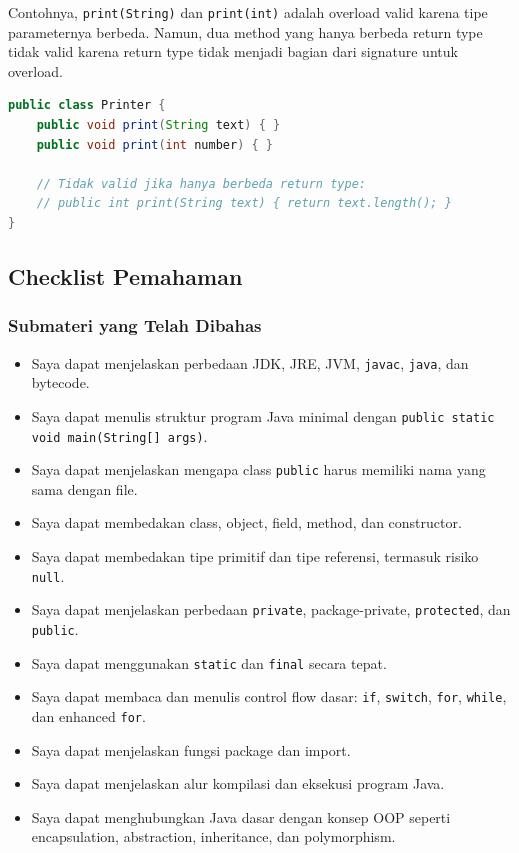 Contohnya, \texttt{print(String)} dan \texttt{print(int)} adalah overload valid karena tipe parameternya berbeda. Namun, dua method yang hanya berbeda return type tidak valid karena return type tidak menjadi bagian dari signature untuk overload.

\begin{lstlisting}[language=Java, caption={Overload valid dan tidak valid}, label={lst:method-signature}]
public class Printer {
    public void print(String text) { }
    public void print(int number) { }

    // Tidak valid jika hanya berbeda return type:
    // public int print(String text) { return text.length(); }
}
\end{lstlisting}

\subsection{Checklist Pemahaman}

\subsubsection{Submateri yang Telah Dibahas}

\begin{itemize}
    \item[$\square$] Saya dapat menjelaskan perbedaan JDK, JRE, JVM, \texttt{javac}, \texttt{java}, dan bytecode.
    \item[$\square$] Saya dapat menulis struktur program Java minimal dengan \texttt{public static void main(String[] args)}.
    \item[$\square$] Saya dapat menjelaskan mengapa class \texttt{public} harus memiliki nama yang sama dengan file.
    \item[$\square$] Saya dapat membedakan class, object, field, method, dan constructor.
    \item[$\square$] Saya dapat membedakan tipe primitif dan tipe referensi, termasuk risiko \texttt{null}.
    \item[$\square$] Saya dapat menjelaskan perbedaan \texttt{private}, package-private, \texttt{protected}, dan \texttt{public}.
    \item[$\square$] Saya dapat menggunakan \texttt{static} dan \texttt{final} secara tepat.
    \item[$\square$] Saya dapat membaca dan menulis control flow dasar: \texttt{if}, \texttt{switch}, \texttt{for}, \texttt{while}, dan enhanced \texttt{for}.
    \item[$\square$] Saya dapat menjelaskan fungsi package dan import.
    \item[$\square$] Saya dapat menjelaskan alur kompilasi dan eksekusi program Java.
    \item[$\square$] Saya dapat menghubungkan Java dasar dengan konsep OOP seperti encapsulation, abstraction, inheritance, dan polymorphism.
\end{itemize}

